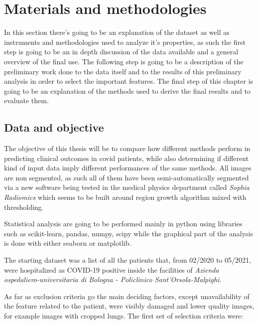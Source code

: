 \chapter{Materials and methodologies}\label{cap: Material_method}
In this section there's going to be an explanation of the dataset as well as instruments and methodologies used to analyze it's properties, as such the first step is going to be an in depth discussion of the data available and a general overview of the final use. The following step is going to be a description of the preliminary work done to the data itself and to the results of this preliminary analysis in order to select the important features. The final step of this chapter is going to be an explanation of the methods used to derive the final results and to evaluate them.


\section{Data and objective}
\label{chap:freefree}
The objective of this thesis will be to compare how different methods perform in predicting clinical outcomes in covid patients, while also determining if different kind of input data imply different performances of the same methods.
All images are non segmented, as such all of them have been semi-automatically segmented via a new software being tested in the medical physics department called \textit{Sophia Radiomics}  which seems to be built around region growth algorithm mixed with thresholding. 

Statistical analysis are going to be performed mainly in python using libraries such as scikit-learn, pandas, numpy, scipy while the graphical part of the analysis is done with either seaborn or matplotlib.

The starting dataset was a list of all the patients that, from 02/2020 to 05/2021, were hospitalized as COVID-19 positive inside the facilities of \textit{Azienda ospedaliero-universitaria di Bologna - Policlinico Sant'Orsola-Malpighi}. 

As far as exclusion criteria go the main deciding factors, except unavailability of the feature related to the patient, were visibly damaged and lower quality images, for example images with cropped lungs. The first set of selection criteria were:

